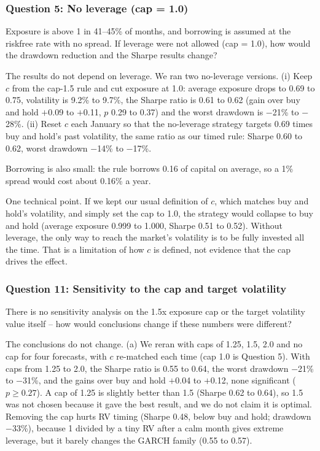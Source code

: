 \subsubsection*{Question 5: No leverage (cap = 1.0)}
\begin{question}
Exposure is above 1 in 41--45\% of months, and borrowing is assumed at the riskfree rate with no spread. If leverage were not allowed (cap = 1.0), how would the drawdown reduction and the Sharpe results change?
\end{question}
The results do not depend on leverage. We ran two no-leverage versions. (i) Keep $c$ from the cap-1.5 rule and cut exposure at 1.0: average exposure drops to 0.69 to 0.75, volatility is 9.2\% to 9.7\%, the Sharpe ratio is 0.61 to 0.62 (gain over buy and hold $+$0.09 to $+$0.11, $p$ 0.29 to 0.37) and the worst drawdown is $-$21\% to $-$28\%. (ii) Reset $c$ each January so that the no-leverage strategy targets 0.69 times buy and hold's past volatility, the same ratio as our timed rule: Sharpe 0.60 to 0.62, worst drawdown $-$14\% to $-$17\%.

Borrowing is also small: the rule borrows 0.16 of capital on average, so a 1\% spread would cost about 0.16\% a year.

One technical point. If we kept our usual definition of $c$, which matches buy and hold's volatility, and simply set the cap to 1.0, the strategy would collapse to buy and hold (average exposure 0.999 to 1.000, Sharpe 0.51 to 0.52). Without leverage, the only way to reach the market's volatility is to be fully invested all the time. That is a limitation of how $c$ is defined, not evidence that the cap drives the effect.

\subsubsection*{Question 11: Sensitivity to the cap and target volatility}
\begin{question}
There is no sensitivity analysis on the 1.5x exposure cap or the target volatility value itself -- how would conclusions change if these numbers were different?
\end{question}
The conclusions do not change. (a) We reran with caps of 1.25, 1.5, 2.0 and no cap for four forecasts, with $c$ re-matched each time (cap 1.0 is Question 5). With caps from 1.25 to 2.0, the Sharpe ratio is 0.55 to 0.64, the worst drawdown $-$21\% to $-$31\%, and the gains over buy and hold $+$0.04 to $+$0.12, none significant ($p\ge 0.27$). A cap of 1.25 is slightly better than 1.5 (Sharpe 0.62 to 0.64), so 1.5 was not chosen because it gave the best result, and we do not claim it is optimal. Removing the cap hurts RV timing (Sharpe 0.48, below buy and hold; drawdown $-$33\%), because 1 divided by a tiny RV after a calm month gives extreme leverage, but it barely changes the GARCH family (0.55 to 0.57).


